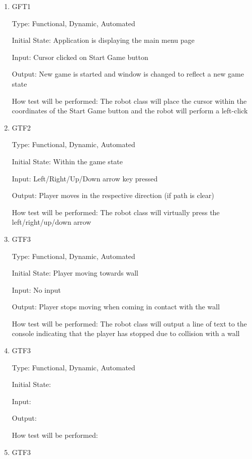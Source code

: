 \documentclass[12pt, titlepage]{article}
\begin{document}
\begin{enumerate}

\item{GFT1\\}

Type: Functional, Dynamic, Automated
					
Initial State: Application is displaying the main menu page
					
Input: Cursor clicked on Start Game button
					
Output: New game is started and window is changed to reflect a new game state
					
How test will be performed: The robot class will place the cursor within the coordinates of the Start Game button and the robot will perform a left-click
					
\item{GTF2\\}

Type: Functional, Dynamic, Automated
					
Initial State: Within the game state
					
Input: Left/Right/Up/Down arrow key pressed
					
Output: Player moves in the respective direction (if path is clear)
					
How test will be performed: The robot class will virtually press the left/right/up/down arrow

\item{GTF3\\}

Type: Functional, Dynamic, Automated
					
Initial State: Player moving towards wall
					
Input: No input
					
Output: Player stops moving when coming in contact with the wall

How test will be performed: The robot class will output a line of text to the console indicating that the player has stopped due to collision with a wall

\item{GTF3\\}

Type: Functional, Dynamic, Automated
					
Initial State: 
					
Input: 
					
Output: 

How test will be performed: 

\item{GTF3\\}


\end{enumerate}
\end{document}
